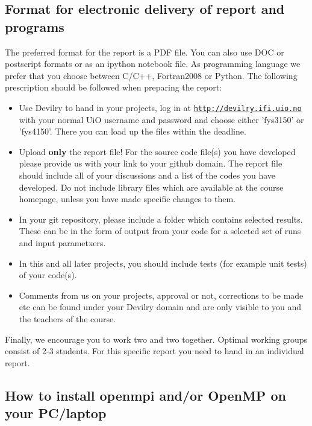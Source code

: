 \documentclass[%
oneside,                 %
final,                   %
10pt]{article}
\begin{document}
\noindent
\subsection{Format for electronic delivery of report and programs}

The preferred format for the report is a PDF file. You can also use DOC or postscript formats or as an ipython notebook file.  As programming language we prefer that you choose between C/C++, Fortran2008 or Python. The following prescription should be followed when preparing the report:

\begin{itemize}
  \item Use Devilry to hand in your projects, log in  at  \href{{http://devilry.ifi.uio.no}}{\nolinkurl{http://devilry.ifi.uio.no}} with your normal UiO username and password and choose either 'fys3150' or 'fys4150'. There you can load up the files within the deadline.

  \item Upload \textbf{only} the report file!  For the source code file(s) you have developed please provide us with your link to your github domain.  The report file should include all of your discussions and a list of the codes you have developed.  Do not include library files which are available at the course homepage, unless you have made specific changes to them.

  \item In your git repository, please include a folder which contains selected results. These can be in the form of output from your code for a selected set of runs and input parametxers.

  \item In this and all later projects, you should include tests (for example unit tests) of your code(s).

  \item Comments  from us on your projects, approval or not, corrections to be made  etc can be found under your Devilry domain and are only visible to you and the teachers of the course.
\end{itemize}

\noindent
Finally, 
we encourage you to work two and two together. Optimal working groups consist of 
2-3 students. For this specific report you need to hand in an individual report.



\subsection{How to install openmpi and/or OpenMP on your PC/laptop}
\end{document}
